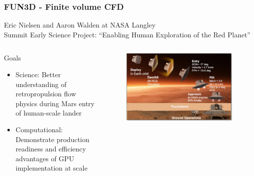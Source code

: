 \documentclass[aspectratio=169]{beamer}
\begin{document}
\begin{frame}
  \frametitle{FUN3D - Finite volume CFD}
  Eric Nielsen and Aaron Walden at NASA Langley \\
  Summit Early Science Project: ``Enabling Human Exploration of the Red Planet''
  \begin{columns}
    \begin{column}{0.5\textwidth}
      Goals
      \begin{itemize}
        \item Science: Better understanding of retropropulsion flow physics during Mars entry of human-scale lander
        \item Computational: Demonstrate production readiness and efficiency advantages of GPU implementation at scale
      \end{itemize}
    \end{column}
    \begin{column}{0.5\textwidth}
      \begin{figure}
        \centering
        \includegraphics[width=.9\textwidth]{figures/fun3d-EDL.png}
      \end{figure}
    \end{column}
  \end{columns}
\end{frame}
\end{document}
